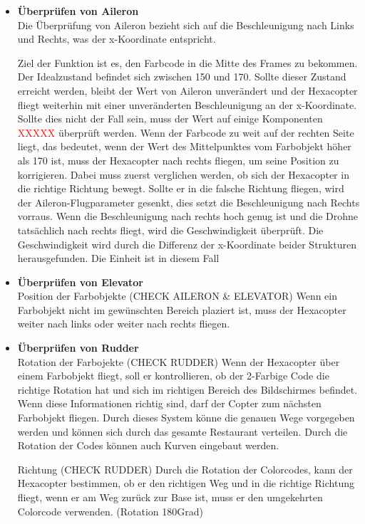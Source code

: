       \begin{itemize}
        \item \textbf{Überprüfen von Aileron}\\
        Die Überprüfung von Aileron bezieht sich auf die Beschleunigung nach Links und Rechts, was der x-Koordinate entspricht.

        Ziel der Funktion ist es, den Farbcode in die Mitte des Frames zu bekommen. Der Idealzustand befindet sich zwischen 150 und 170.
        Sollte dieser Zustand erreicht werden, bleibt der Wert von Aileron unverändert und der Hexacopter fliegt weiterhin mit einer unveränderten Beschleunigung an der
        x-Koordinate.
        Sollte dies nicht der Fall sein, muss der Wert auf einige Komponenten \textcolor{red}{XXXXX} überprüft werden.
        Wenn der Farbcode zu weit auf der rechten Seite liegt, das bedeutet, wenn der Wert des Mittelpunktes vom Farbobjekt höher als 170 ist,
        muss der Hexacopter nach rechts fliegen, um seine Position zu korrigieren.
        Dabei muss zuerst verglichen werden, ob sich der Hexacopter in die richtige Richtung bewegt. Sollte er in die falsche Richtung
        fliegen, wird der Aileron-Flugparameter gesenkt, dies setzt die Beschleunigung nach Rechts vorraus.
        Wenn die Beschleunigung nach rechts hoch genug ist und die Drohne tatsächlich nach rechts fliegt, wird die Geschwindigkeit überprüft.
        Die Geschwindigkeit wird durch die Differenz der x-Koordinate beider Strukturen herausgefunden. Die Einheit ist in diesem Fall

        \item \textbf{Überprüfen von Elevator}\\
        Position der Farbobjekte (CHECK AILERON \& ELEVATOR)
        Wenn ein Farbobjekt nicht im gewünschten Bereich plaziert ist, muss der Hexacopter weiter nach links oder weiter nach rechts fliegen.
        \item \textbf{Überprüfen von Rudder}\\
        Rotation der Farbojekte (CHECK RUDDER)
        Wenn der Hexacopter über einem Farbobjekt fliegt, soll er kontrollieren, ob der 2-Farbige Code die richtige Rotation hat und sich im richtigen Bereich des Bildschirmes befindet. Wenn diese Informationen richtig sind, darf der Copter zum nächsten Farbobjekt fliegen.
        Durch dieses System könne die genauen Wege vorgegeben werden und können sich durch das gesamte Restaurant verteilen. Durch die Rotation der Codes können auch Kurven eingebaut werden.

        Richtung (CHECK RUDDER)
        Durch die Rotation der Colorcodes, kann der Hexacopter bestimmen, ob er den richtigen Weg und in die richtige Richtung fliegt, wenn er am Weg zurück zur Base ist, muss er den umgekehrten Colorcode verwenden. (Rotation 180Grad)
      \end{itemize}

